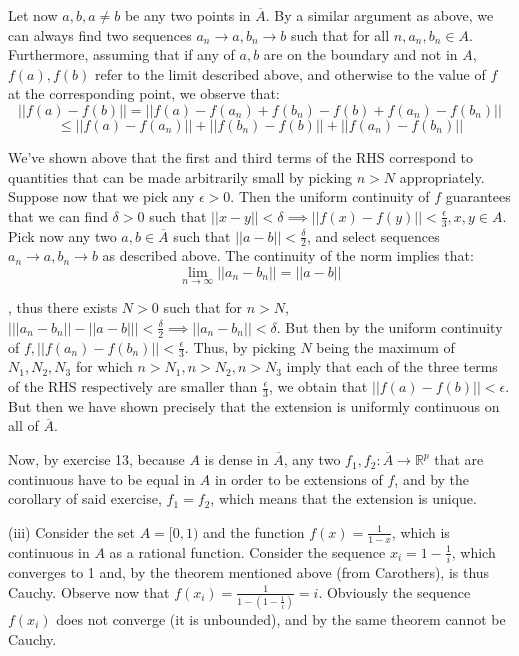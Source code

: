 \begin{solution}
    Let now $a, b, a \neq b$ be any two points in $\overline{A}$. By a similar argument as above, we can always find two sequences $a_n \rightarrow a, b_n \rightarrow b$ such that for all $n, a_n, b_n \in A$. Furthermore, assuming that if any of $a, b$ are on the boundary and not in $A$, $f(a), f(b)$ refer to the limit described above, and otherwise to the value of $f$ at the corresponding point, we observe that:
    $$\lvert \lvert f(a) - f(b) \rvert \rvert = \lvert \lvert f(a) - f(a_n) + f(b_n) - f(b) + f(a_n) - f(b_n) \rvert \rvert$$
    $$\leq \lvert \lvert f(a) - f(a_n) \rvert \rvert + \lvert \lvert f(b_n) - f(b) \rvert \rvert + \lvert \lvert f(a_n) - f(b_n) \rvert \rvert$$

    We've shown above that the first and third terms of the RHS correspond to quantities that can be made arbitrarily small by picking $n > N$ appropriately. Suppose now that we pick any $\epsilon > 0$. Then the uniform continuity of $f$ guarantees that we can find $\delta > 0$ such that $\lvert \lvert x - y \rvert \rvert < \delta \implies \lvert \lvert f(x) - f(y) \rvert \rvert < \frac{\epsilon}{3}, x, y \in A$. Pick now any two $a, b \in \overline{A}$ such that $\lvert \lvert a - b \rvert \rvert < \frac{\delta}{2}$, and select sequences $a_n \rightarrow a, b_n \rightarrow b$ as described above. The continuity of the norm implies that:
    $$\lim_{n \rightarrow \infty} \lvert \lvert a_n - b_n \rvert \rvert = \lvert \lvert a - b \rvert \rvert$$

    , thus there exists $N > 0$ such that for $n > N$, $\bigl\lvert \lvert \lvert a_n - b_n \rvert \rvert - \lvert \lvert a - b \rvert \rvert \bigr\rvert < \frac{\delta}{2} \implies \lvert \lvert a_n - b_n \rvert \rvert < \delta$. But then by the uniform continuity of $f, \lvert \lvert f(a_n) - f(b_n) \rvert \rvert < \frac{\epsilon}{3}$. Thus, by picking $N$ being the maximum of $N_1, N_2, N_3$ for which $n > N_1, n> N_2, n > N_3$ imply that each of the three terms of the RHS respectively are smaller than $\frac{\epsilon}{3}$, we obtain that $\lvert \lvert f(a) - f(b) \rvert \rvert < \epsilon$. But then we have shown precisely that the extension is uniformly continuous on all of $\overline{A}$.
    
    Now, by exercise 13, because $A$ is dense in $\overline{A}$, any two $f_1, f_2: \overline{A} \rightarrow \mathbb{R}^p$ that are continuous have to be equal in $A$ in order to be extensions of $f$, and by the corollary of said exercise, $f_1 = f_2$, which means that the extension is unique.

    (iii) Consider the set $A = [0, 1)$ and the function $f(x) = \frac{1}{1 - x}$, which is continuous in $A$ as a rational function. Consider the sequence $x_i = 1 - \frac{1}{i}$, which converges to 1 and, by the theorem mentioned above (from Carothers), is thus Cauchy. Observe now that $f(x_i) = \frac{1}{1 - (1 - \frac{1}{i})} = i$. Obviously the sequence $f(x_i)$ does not converge (it is unbounded), and by the same theorem cannot be Cauchy.

    
\end{solution}


